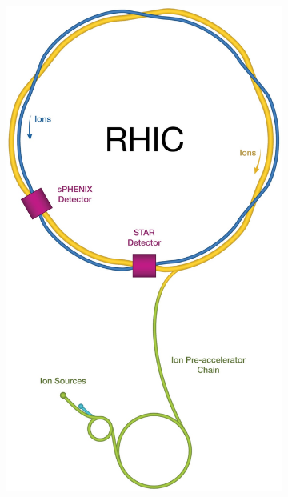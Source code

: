 \begin{figure}[ht]
    \centering
    \begin{subfigure}{.25\linewidth}
        \includegraphics[width=\linewidth]{img/rhic.jpg}
        \caption{}
        \label{fig:eic:rhic}
    \end{subfigure}\hspace{.2\linewidth}
    \begin{subfigure}{.3\linewidth}

\end{subfigure}
\end{figure}

